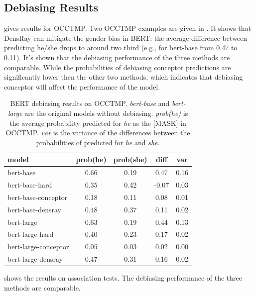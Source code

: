 
\subsection{Debiasing Results}
 gives results for OCCTMP. Two OCCTMP
examples are given in . It shows that
DensRay can mitigate the gender bias in BERT: the average
difference between predicting he/she drops to around two
third (e.g., for bert-base from 0.47 to 0.11). It's shown that the debiasing performance of the three methods are comparable. While the probabilities of debiasing conceptor predictions are significantly lower then the other two methods, which indicates that debiasing conceptor will affect the performance of the model.

\begin{table}[ht]
\centering
\footnotesize
\begin{tabular}{lcccc}
\hline
model & prob(he) & prob(she) & diff & var\\
\hline
bert-base & 0.66 & 0.19 & 0.47 &0.16\\
bert-base-hard & 0.35 & 0.42 & -0.07  &0.03\\
bert-base-conceptor & 0.18 & 0.11 & 0.08 & 0.01\\
bert-base-densray & 0.48 & 0.37 & {0.11} &0.02\\
\hline
bert-large  & 0.63 & 0.19 & 0.44  &0.13\\
bert-large-hard & 0.40 & 0.23 & 0.17  &0.02\\
bert-large-conceptor & 0.05 & 0.03 & 0.02 & 0.00\\
bert-large-densray  & 0.47 & 0.31 & {0.16} &0.02 \\
\hline
\end{tabular}
\caption{ BERT debiasing results on
  OCCTMP. \textit{bert-base} and \textit{bert-large} are the
  original models without debiasing. \textit{prob(he)} is
  the average probability  predicted for \textit{he} as
  the [MASK] in OCCTMP. \textit{var} is the variance of the
  differences between the probabilities of  predicted
  for \textit{he} and \textit{she}.}
\end{table}

 shows the results on association tests. The debiasing performance of the three methods are comparable.

